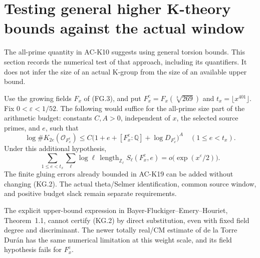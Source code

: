 \section{Testing general higher K-theory bounds against the actual window}
\label{sec:k-theory-growth-audit}

The all-prime quantity in AC-K10 suggests using general torsion
bounds.  This section records the numerical test of that approach,
including its quantifiers.  It does not infer the size of an actual
K-group from the size of an available upper bound.

\begin{proposition}
\label{AC-K24}
Use the growing fields $F_x$ of (FG.3), and put
$F_x^{\mathrm c}=F_x(\sqrt[3]{269})$ and
$t_x=\lfloor x^{401}\rfloor$.  Fix $0<\varepsilon<1/52$.
The following would suffice for the all-prime size part of
the arithmetic budget: constants $C,A>0$, independent of
$x$, the selected source primes, and $e$, such that
\[
 \log\#K_{2e}(\mathcal O_{F_x^{\mathrm c}})
 \leq C\bigl(1+e+[F_x^{\mathrm c}:\mathbb Q]
                    +\log D_{F_x^{\mathrm c}}\bigr)^A
       \quad(1\leq e<t_x).                         \tag{KG.1}
\]
Under this additional hypothesis,
\[
 \sum_{1\leq e<t_x}\sum_\ell\log\ell\,
  \operatorname{length}_{\mathbb Z_\ell}
        S_\ell(F_x^{\mathrm c},e)
       =o\bigl(\exp(x^\varepsilon/2)\bigr).         \tag{KG.2}
\]
The finite gluing errors already bounded in AC-K19 can be
added without changing (KG.2).  The actual theta/Selmer
identification, common source window, and positive budget slack
remain separate requirements.

The explicit upper-bound expression in Bayer-Fluckiger--Emery--Houriet,
Theorem~1.1, cannot certify (KG.2) by direct substitution,
even with fixed field degree and discriminant.  The newer
totally real/CM estimate of de la Torre Dur\'an has the same
numerical limitation at this weight scale, and its field
hypothesis fails for $F_x^{\mathrm c}$.
\end{proposition}
